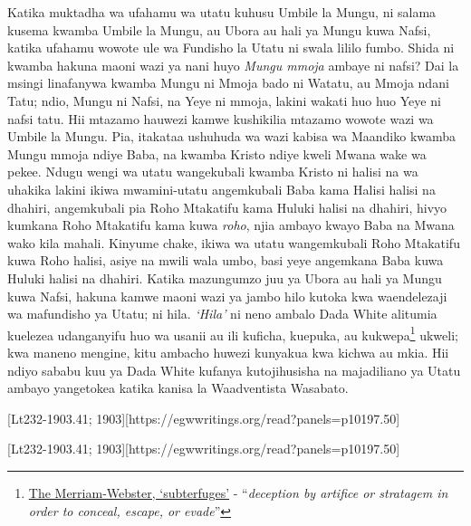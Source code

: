Katika muktadha wa ufahamu wa utatu kuhusu Umbile la Mungu, ni salama kusema kwamba Umbile la Mungu, au Ubora au hali ya Mungu kuwa Nafsi, katika ufahamu wowote ule wa Fundisho la Utatu ni swala lililo fumbo. Shida ni kwamba hakuna maoni wazi ya nani huyo \textit{Mungu mmoja} ambaye ni nafsi? Dai la msingi linafanywa kwamba Mungu ni Mmoja bado ni Watatu, au Mmoja ndani Tatu; ndio, Mungu ni Nafsi, na Yeye ni mmoja, lakini wakati huo huo Yeye ni nafsi tatu. Hii mtazamo hauwezi kamwe kushikilia mtazamo wowote wazi wa Umbile la Mungu. Pia, itakataa ushuhuda wa wazi kabisa wa Maandiko kwamba Mungu mmoja ndiye Baba, na kwamba Kristo ndiye kweli Mwana wake wa pekee. Ndugu wengi wa utatu wangekubali kwamba Kristo ni halisi na wa uhakika lakini ikiwa mwamini-utatu angemkubali Baba kama Halisi halisi na dhahiri, angemkubali pia Roho Mtakatifu kama Huluki halisi na dhahiri, hivyo kumkana Roho Mtakatifu kama kuwa \textit{roho}, njia ambayo kwayo Baba na Mwana wako kila mahali. Kinyume chake, ikiwa wa utatu wangemkubali Roho Mtakatifu kuwa Roho halisi, asiye na mwili wala umbo, basi yeye angemkana Baba kuwa Huluki halisi na dhahiri. Katika mazungumzo juu ya Ubora au hali ya Mungu kuwa Nafsi, hakuna kamwe maoni wazi ya jambo hilo kutoka kwa waendelezaji wa mafundisho ya Utatu; ni hila. \textit{‘Hila’} ni neno ambalo Dada White alitumia kuelezea udanganyifu huo wa usanii au ili kuficha, kuepuka, au kukwepa\footnote{\href{https://www.merriam-webster.com/dictionary/subterfuges}{The Merriam-Webster, ‘subterfuges’} - “\textit{deception by artifice or stratagem in order to conceal, escape, or evade}”} ukweli; kwa maneno mengine, kitu ambacho huwezi kunyakua kwa kichwa au mkia. Hii ndiyo sababu kuu ya Dada White kufanya kutojihusisha na majadiliano ya Utatu ambayo yangetokea katika kanisa la Waadventista Wasabato.


[Lt232-1903.41; 1903][https://egwwritings.org/read?panels=p10197.50]


[Lt232-1903.41; 1903][https://egwwritings.org/read?panels=p10197.50]


